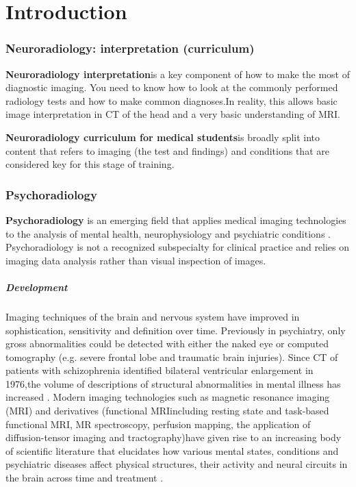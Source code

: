 \chapter{Introduction}

\subsection{Neuroradiology: interpretation (curriculum)}

\textbf{Neuroradiology interpretation}is a key component of how to make the most of diagnostic imaging. You need to know how to look at the commonly performed radiology tests and how to make common diagnoses.In reality, this allows basic image interpretation in CT of the head and a very basic understanding of MRI.

\textbf{Neuroradiology curriculum for medical students}is broadly split into content that refers to imaging (the test and findings) and conditions that are considered key for this stage of training.

\subsection{Psychoradiology}

\textbf{Psychoradiology} is an emerging field that applies medical imaging technologies to the analysis of mental health, neurophysiology and psychiatric conditions . Psychoradiology is not a recognized subspecialty for clinical practice and relies on imaging data analysis rather than visual inspection of images.

\paragraph{Development}

Imaging techniques of the brain and nervous system have improved in sophistication, sensitivity and definition over time. Previously in psychiatry, only gross abnormalities could be detected with either the naked eye or computed tomography (e.g. severe frontal lobe and traumatic brain injuries). Since CT of patients with schizophrenia identified bilateral ventricular enlargement in 1976,the volume of descriptions of structural abnormalities in mental illness has increased . Modern imaging technologies such as magnetic resonance imaging (MRI) and derivatives (functional MRIincluding resting state and task-based functional MRI, MR spectroscopy, perfusion mapping, the application of diffusion-tensor imaging and tractography)have given rise to an increasing body of scientific literature that elucidates how various mental states, conditions and psychiatric diseases affect physical structures, their activity and neural circuits in the brain across time and treatment .

